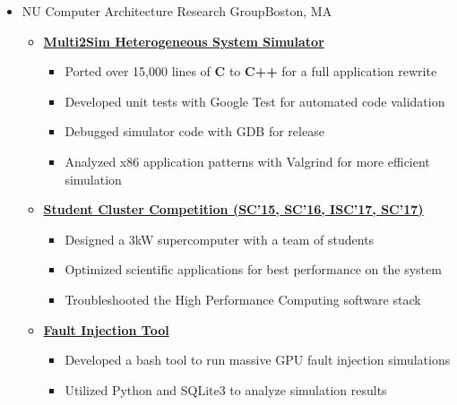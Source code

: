 \documentclass[11pt,letterpaper,sans]{moderncv}
\begin{document}
\begin{itemize}
\item[] {
{NU Computer Architecture Research Group}{Boston, MA}{}{\vspace{3pt}}
\vspace{-3mm}	\begin{itemize}
	\item \textbf{\href{http://multi2sim.org}{Multi2Sim Heterogeneous System Simulator}}
		\begin{itemize}
		\item Ported over 15,000 lines of \textbf{C} to \textbf{C++} for a full application rewrite
		\item Developed unit tests with Google Test for automated code validation
		\item Debugged simulator code with GDB for release
		\item Analyzed x86 application patterns with Valgrind for more efficient simulation
		\end{itemize}
	\item \textbf{\href{studentclustercompetition.us}{Student Cluster Competition (SC'15, SC'16, ISC'17, SC'17)}}
		\begin{itemize}
		\item Designed a 3kW supercomputer with a team of students
		\item Optimized scientific applications for best performance on the system
		\item Troubleshooted the High Performance Computing software stack 
		\end{itemize}
	\item \textbf{\href{https://github.com/spencerhance/multi2sim-FaultInjectionTool}{Fault Injection Tool}}
		\begin{itemize}
		\item Developed a bash tool to run massive GPU fault injection simulations
		\item Utilized Python and SQLite3 to analyze simulation results
		\end{itemize}
		
\end{itemize}		
}
\vspace{6pt}



\end{itemize}
\end{document}
